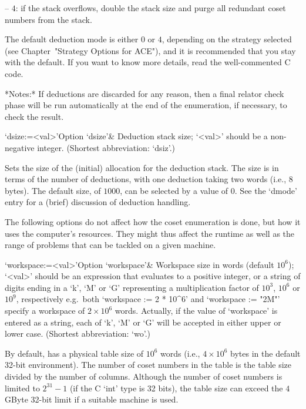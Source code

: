 \item{--} $4$:
if the stack overflows, double the stack size and purge all  redundant
coset numbers from the stack.

\endlist

The default deduction mode is either $0$  or  $4$,  depending  on  the
strategy selected (see Chapter~"Strategy Options for ACE"), and it  is
recommended that you stay with the default. If you want to  know  more
details, read the well-commented C code.

*Notes:*
If deductions are discarded for any reason, then a final relator check
phase  will be run  automatically at  the end  of the  enumeration, if
necessary, to check the result.

\>`dsize:=<val>'{Option `dsize'}&
Deduction stack size; `<val>' should be a non-negative integer.
(Shortest abbreviation: `dsiz'.)

Sets the  size of  the (initial) allocation  for the  deduction stack.
The size is  in terms of the number of  deductions, with one deduction
taking two words (i.e., 8 bytes).  The default size, of $1000$, can be
selected  by  a value  of  0.   See the  `dmode' entry  for a  (brief)
discussion of deduction handling.

\enditems


The following options do not affect how the coset enumeration is done,
but how it  uses the computer's resources. They  might thus affect the
runtime as  well as  the range of  problems that  can be tackled  on a
given machine.

\beginitems

\>`workspace:=<val>'{Option `workspace'}&
Workspace size in words (default $10^6$);
`<val>' should be an expression that evaluates to a positive  integer,
or a string of digits ending in a  `k',  `M'  or  `G'  representing  a
multiplication  factor  of  $10^3$,  $10^6$  or  $10^9$,  respectively
e.g.~both `workspace := 2 * 10^6' and `workspace :=  "2M"'  specify  a
workspace  of  $2\times10^6$  words.  Actually,  if   the   value   of
`workspace' is entered as a string, each of `k', `M' or  `G'  will  be
accepted in either upper or lower case. (Shortest abbreviation: `wo'.)

By default, {\ACE} has a physical table size of $10^6$ words (i.e., $4
\times 10^6$ bytes in the  default 32-bit environment).  The number of
coset numbers in the table is  the table size divided by the number of
columns.   Although  the  number   of  coset  numbers  is  limited  to
$2^{31}-1$ (if the C `int' type is 32 bits), the table size can exceed
the $4$GByte 32-bit limit if a suitable machine is used.

